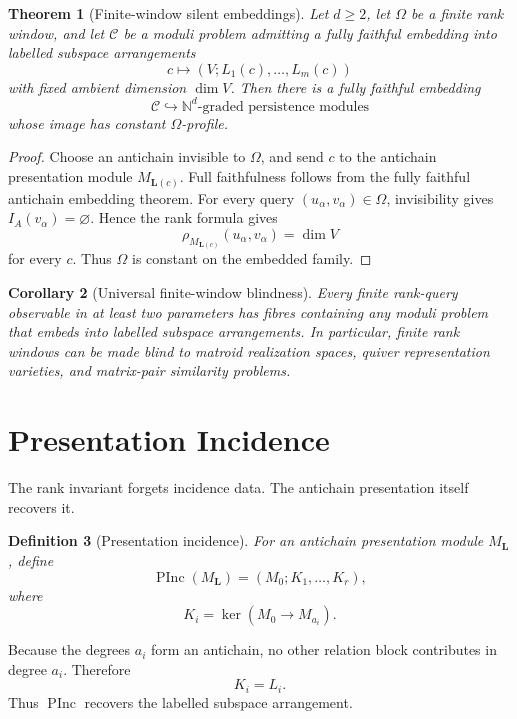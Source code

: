 \documentclass[11pt]{article}
\newtheorem{theorem}{Theorem}[section]
\newtheorem{corollary}[theorem]{Corollary}
\newtheorem{definition}[theorem]{Definition}
\begin{document}
\begin{theorem}[Finite-window silent embeddings]
Let \(d\ge2\), let \(\Omega\) be a finite rank window, and let \(\mathcal C\) be a moduli problem admitting a fully faithful embedding into labelled subspace arrangements
\[
c\longmapsto (V;L_1(c),\ldots,L_m(c))
\]
with fixed ambient dimension \(\dim V\). Then there is a fully faithful embedding
\[
\mathcal C\hookrightarrow \mathbb N^d\text{-graded persistence modules}
\]
whose image has constant \(\Omega\)-profile.
\end{theorem}

\begin{proof}
Choose an antichain invisible to \(\Omega\), and send \(c\) to the antichain presentation module \(M_{\mathbf L(c)}\). Full faithfulness follows from the fully faithful antichain embedding theorem. For every query \((u_\alpha,v_\alpha)\in\Omega\), invisibility gives \(I_A(v_\alpha)=\varnothing\). Hence the rank formula gives
\[
\rho_{M_{\mathbf L(c)}}(u_\alpha,v_\alpha)
=
\dim V
\]
for every \(c\). Thus \(\Omega\) is constant on the embedded family.
\end{proof}

\begin{corollary}[Universal finite-window blindness]
Every finite rank-query observable in at least two parameters has fibres containing any moduli problem that embeds into labelled subspace arrangements. In particular, finite rank windows can be made blind to matroid realization spaces, quiver representation varieties, and matrix-pair similarity problems.
\end{corollary}

\section{Presentation Incidence}

The rank invariant forgets incidence data. The antichain presentation itself recovers it.

\begin{definition}[Presentation incidence]
For an antichain presentation module \(M_{\mathbf L}\), define
\[
\operatorname{PInc}(M_{\mathbf L})
=
\left(M_0;K_1,\ldots,K_r\right),
\]
where
\[
K_i=\ker(M_0\to M_{a_i}).
\]
\end{definition}

Because the degrees \(a_i\) form an antichain, no other relation block contributes in degree \(a_i\). Therefore
\[
K_i=L_i.
\]
Thus \(\operatorname{PInc}\) recovers the labelled subspace arrangement.
\end{document}
